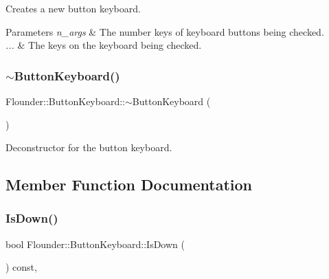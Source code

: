 Creates a new button keyboard. 


\begin{DoxyParams}{Parameters}
{\em n\+\_\+args} & The number keys of keyboard buttons being checked. \\
\hline
{\em ...} & The keys on the keyboard being checked. \\
\hline
\end{DoxyParams}
\mbox{\label{class_flounder_1_1_button_keyboard_a5eca7c902d0e48d06909caa8185f51b7}} 
\subsubsection{\texorpdfstring{$\sim$\+Button\+Keyboard()}{~ButtonKeyboard()}}
{\footnotesize\ttfamily Flounder\+::\+Button\+Keyboard\+::$\sim$\+Button\+Keyboard (\begin{DoxyParamCaption}{ }\end{DoxyParamCaption})}



Deconstructor for the button keyboard. 



\subsection{Member Function Documentation}
\mbox{\label{class_flounder_1_1_button_keyboard_aa90e1ba336eea1bf4cecd4ed7def7a02}} 
\subsubsection{\texorpdfstring{Is\+Down()}{IsDown()}}
{\footnotesize\ttfamily bool Flounder\+::\+Button\+Keyboard\+::\+Is\+Down (\begin{DoxyParamCaption}{ }\end{DoxyParamCaption}) const\hspace{0.3cm}{\ttfamily [override]}, {\ttfamily [virtual]}}



